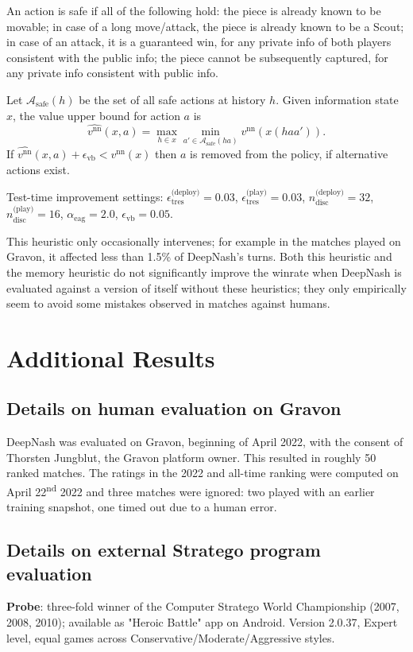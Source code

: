 An action is safe if all of the following hold: the piece is already known to be movable; in case of a long move/attack, the piece is already known to be a Scout; in case of an attack, it is a guaranteed win, for any private info of both players consistent with the public info; the piece cannot be subsequently captured, for any private info consistent with public info.

Let $\mathcal{A}_\textrm{safe}(h)$ be the set of all safe actions at history $h$. Given information state $x$, the value upper bound for action $a$ is
$$\widehat{v^\textrm{nn}}(x, a) = \max_{h \in x} \min_{a' \in \mathcal{A}_\textrm{safe}(ha)} v^\textrm{nn}(x(haa')).$$
If $\widehat{v^\textrm{nn}}(x, a) + \epsilon_\text{vb} < v^\textrm{nn}(x)$ then $a$ is removed from the policy, if alternative actions exist.

Test-time improvement settings: $\epsilon_\text{tres}^\text{(deploy)}=0.03$, $\epsilon_\text{tres}^\text{(play)}=0.03$, $n_\text{disc}^\text{(deploy)}=32$, $n_\text{disc}^\text{(play)}=16$, $\alpha_\text{eag}=2.0$, $\epsilon_\text{vb}=0.05$.

This heuristic only occasionally intervenes; for example in the matches played on Gravon, it affected less than 1.5\% of DeepNash's turns. Both this heuristic and the memory heuristic do not significantly improve the winrate when DeepNash is evaluated against a version of itself without these heuristics; they only empirically seem to avoid some mistakes observed in matches against humans.

\section{Additional Results}

\subsection{Details on human evaluation on Gravon}
DeepNash was evaluated on Gravon, beginning of April 2022, with the consent of Thorsten Jungblut, the Gravon platform owner. This resulted in roughly 50 ranked matches. The ratings in the 2022 and all-time ranking were computed on April 22\textsuperscript{nd} 2022 and three matches were ignored: two played with an earlier training snapshot, one timed out due to a human error.

\subsection{Details on external Stratego program evaluation}
\textbf{Probe}: three-fold winner of the Computer Stratego World Championship (2007, 2008, 2010); available as "Heroic Battle" app on Android. Version 2.0.37, Expert level, equal games across Conservative/Moderate/Aggressive styles.

